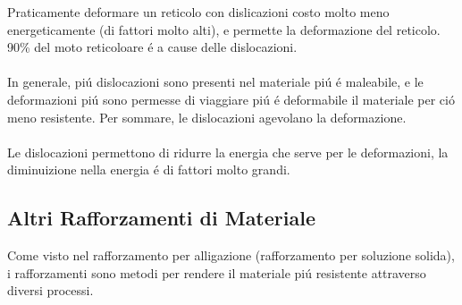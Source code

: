 \documentclass{article}
\begin{document}
                Praticamente deformare un reticolo con dislicazioni costo molto meno energeticamente (di fattori molto alti), e permette la deformazione del reticolo.\\
                90\% del moto reticoloare \'e a cause delle dislocazioni.\\ \\
                In generale, pi\'u dislocazioni sono presenti nel materiale pi\'u \'e maleabile, e le deformazioni pi\'u sono permesse di viaggiare pi\'u \'e deformabile il materiale per ci\'o meno resistente. Per sommare, le dislocazioni agevolano la deformazione.\\ \\
                Le dislocazioni permettono di ridurre la energia che serve per le deformazioni, la diminuizione nella energia \'e di fattori molto grandi.
        \subsection{Altri Rafforzamenti di Materiale}
            Come visto nel rafforzamento per alligazione (rafforzamento per soluzione solida), i rafforzamenti sono metodi per rendere il materiale pi\'u resistente attraverso diversi processi.
\end{document}
